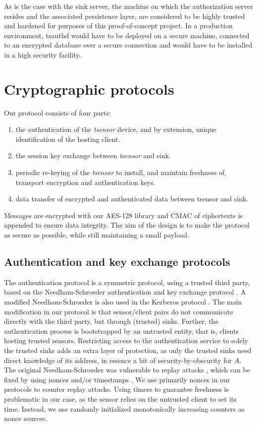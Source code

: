 As is the case with the sink server, the machine on which the authorization server resides and the associated persistence layer, are considered to be highly trusted and hardened for purposes of this proof-of-concept project. In a production environment, tsauthd would have to be deployed on a secure machine, connected to an encrypted database over a secure connection and would have to be installed in a high security facility.

\section{Cryptographic protocols}
\label{sec:cryptographic-protocols}

Our protocol consists of four parts:
%
\begin{enumerate}
\item the authentication of the \textit{tsensor} device, and by extension, unique identification of the hosting client.
\item the session key exchange between \textit{tsensor} and sink.
\item periodic re-keying of the \textit{tsensor} to install, and maintain freshness of, transport encryption and authentication keys.
\item data transfer of encrypted and authenticated data between tsensor and sink.
\end{enumerate} 
%
Messages are encrypted with our AES-128 library and CMAC of ciphertexts is appended to ensure data integrity. The aim of the design is to make the protocol as secure as possible, while still maintaining a small payload.

\subsection{Authentication and key exchange protocols}
\label{sec:cryptographic-protocols-authentication}

The authentication protocol is a symmetric protocol, using a trusted third party, based on the Needham-Schroeder authentication and key exchange protocol . A modified Needham-Schroeder is also used in the Kerberos protocol . The main modification in our protocol is that sensor/client pairs do not communicate directly with the third party, but through (trusted) sinks. Further, the authentication process is bootstrapped by an untrusted entity, that is, clients hosting trusted sensors.
%
Restricting access to the authentication service to solely the trusted sinks adds an extra layer of protection, as only the trusted sinks need direct knowledge of its address, in essence a bit of security-by-obscurity for $A$.
%
The original Needham-Schroeder was vulnerable to replay attacks , which can be fixed by using nonces and/or timestamps \cite{needham1987}. We use primarily nonces in our protocols to counter replay attacks. Using timers to guarantee freshness is problematic in our case, as the sensor relies on the untrusted client to set its time. Instead, we use randomly initialized monotonically increasing counters as nonce sources.

